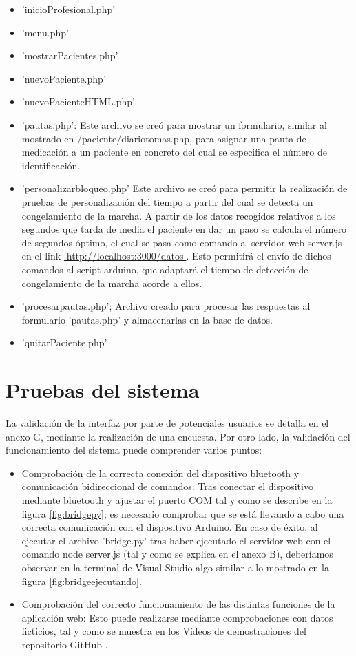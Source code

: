 \begin{itemize}
\begin{itemize}
        \item 'inicioProfesional.php'
        \item 'menu.php'
        \item 'mostrarPacientes.php'
        \item 'nuevoPaciente.php'
        \item 'nuevoPacienteHTML.php'
        \item 'pautas.php': Este archivo se creó para mostrar un formulario, similar al mostrado en /paciente/diariotomas.php, para asignar una pauta de medicación a un paciente en concreto del cual se especifica el número de identificación.
        \item 'personalizarbloqueo.php' Este archivo se creó para permitir la realización de pruebas de personalización del tiempo a partir del cual se detecta un congelamiento de la marcha. A partir de los datos recogidos relativos a los segundos que tarda de media el paciente en dar un paso se calcula el número de segundos óptimo, el cual se pasa como comando al servidor web server.js en el link \url{'http://localhost:3000/datos'}. Esto permitirá el envío de dichos comandos al script arduino, que adaptará el tiempo de detección de congelamiento de la marcha acorde a ellos.
        \item 'procesarpautas.php'; Archivo creado para procesar las respuestas al formulario 'pautas.php' y almacenarlas en la base de datos.
        \item 'quitarPaciente.php'
    \end{itemize}
\end{itemize}

\section{Pruebas del sistema}
La validación de la interfaz por parte de potenciales usuarios se detalla en el anexo G, mediante la realización de una encuesta. Por otro lado, la validación del funcionamiento del sistema puede comprender varios puntos:
\begin{itemize}
    \item Comprobación de la correcta conexión del dispositivo bluetooth y comunicación bidireccional de comandos: Tras conectar el dispositivo mediante bluetooth y ajustar el puerto COM tal y como se describe en la figura \ref{fig:bridgepy}; es necesario comprobar que se está llevando a cabo una correcta comunicación con el dispositivo Arduino. En caso de éxito, al ejecutar el archivo 'bridge.py' tras haber ejecutado el servidor web con el comando node server.js (tal y como se explica en el anexo B), deberíamos observar en la terminal de Visual Studio algo similar a lo mostrado en la figura \ref{fig:bridgeejecutando}.
    \item Comprobación del correcto funcionamiento de las distintas funciones de la aplicación web: Esto puede realizarse mediante comprobaciones con datos ficticios, tal y como se muestra en los Vídeos de demostraciones del repositorio GitHub \cite{MarcosGordillo2024}.
\end{itemize}

